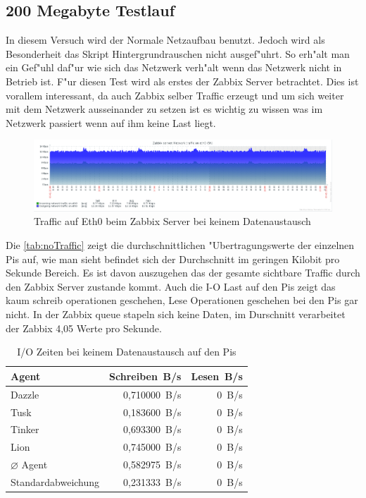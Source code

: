 \subsection{200 Megabyte Testlauf}
\label{subsec:200MBTest}
In diesem Versuch wird der Normale Netzaufbau benutzt. Jedoch wird als Besonderheit das Skript Hintergrundrauschen %
nicht ausgef"uhrt. So erh"alt man ein Gef"uhl daf"ur wie sich das Netzwerk verh"alt wenn das Netzwerk nicht in Betrieb %
ist. F"ur diesen Test wird als erstes der Zabbix Server betrachtet. Dies ist vorallem interessant, da auch Zabbix selber %
Traffic erzeugt und um sich weiter mit dem Netzwerk ausseinander zu setzen ist es wichtig zu wissen was im Netzwerk passiert %
wenn auf ihm keine Last liegt. %
 
\begin{figure}[htbp]
\centering
\includegraphics*[width=0.9\linewidth]{Abb/Zabbix/ZabbixNoTraffic/ZabbixNoTrafficEth0}

\caption{Traffic auf Eth0 beim Zabbix Server bei keinem Datenaustausch}
\label{fig:Eth0ServerNoTraffic}
\end{figure}

Die \cref{tab:noTraffic} zeigt die durchschnittlichen "Ubertragungswerte der einzelnen Pis auf, wie man sieht %
befindet sich der Durchschnitt im geringen Kilobit pro Sekunde Bereich. Es ist davon auszugehen das der gesamte %
sichtbare Traffic durch den Zabbix Server zustande kommt. Auch die I-O Last auf den Pis zeigt das kaum schreib operationen %
geschehen, Lese Operationen geschehen bei den Pis gar nicht. In der Zabbix queue stapeln sich keine Daten, im Durschnitt %
verarbeitet der Zabbix 4,05 Werte pro Sekunde. 

\begin{table}
\centering
\begin{tabular}{l%
 r<{\,B/s}%
 r<{\,B/s}%
}
Agent	  			& Schreiben	 	& Lesen	\\	
\hline
Dazzle 				& 0,710000		& 0	        \\
Tusk 				& 0,183600		& 0		\\
Tinker				& 0,693300 		& 0	 	\\
Lion				& 0,745000		& 0	 	\\
$\diameter $ Agent 		& 0,582975		& 0		\\   
Standardabweichung 		& 0,231333  		& 0		\\
\end{tabular}
\caption{I/O Zeiten bei keinem Datenaustausch auf den Pis}
\label{tab:noTrafficIoStat}
\end{table}



